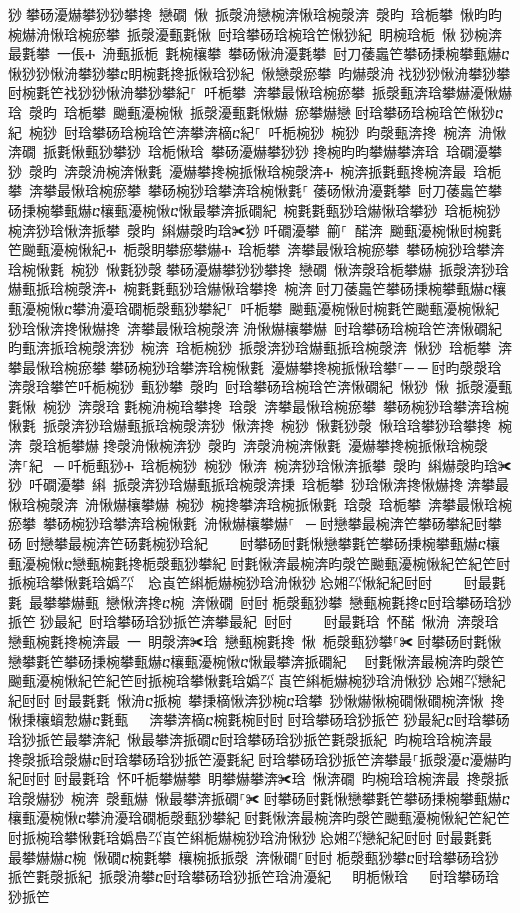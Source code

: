 ﻿\documentclass[output=paper]{langsci/langscibook}
\begin{document}
\begin{exe}
{\begin{exe}
猀਀攀砀瀀爀攀猀猀攀搀 戀礀 愀 挀漀洀戀椀渀愀琀椀漀渀 漀昀 琀栀攀 愀昀昀椀爀洀愀琀椀瘀攀 挀漀瀀甀氀愀 尀琀攀砀琀椀琀笀愀猀紀 眀椀琀栀 愀਀猀椀渀最氀攀 一倀Ⰰ 洀甀挀栀 氀椀欀攀 攀砀愀洀瀀氀攀 尀刀䔀䘀笀攀砀㨀椀攀甀爀ⴀ愀猀猀愀洀攀猀攀ⴀ眀椀氀搀挀愀琀猀紀 愀戀漀瘀攀 昀爀漀洀਀䄀猀猀愀洀攀猀攀尀椀氀笀䄀猀猀愀洀攀猀攀紀⸀ 吀栀攀 渀攀最愀琀椀瘀攀 挀漀甀渀琀攀爀瀀愀爀琀 漀昀 琀栀攀 䬀甀瀀椀愀 挀漀瀀甀氀愀爀 瘀攀爀戀਀尀琀攀砀琀椀琀笀愀猀ⴀ紀 椀猀 尀琀攀砀琀椀琀笀渀攀渀樀ⴀ紀⸀ 吀栀椀猀 椀猀 昀漀甀渀搀 椀渀 洀愀渀礀 挀氀愀甀猀攀猀 琀栀愀琀 攀砀瀀爀攀猀猀਀搀椀昀昀攀爀攀渀琀 琀礀瀀攀猀 漀昀 渀漀洀椀渀愀氀 瀀爀攀搀椀挀愀琀椀漀渀Ⰰ 椀渀挀氀甀搀椀渀最 琀栀攀 渀攀最愀琀椀瘀攀 攀砀椀猀琀攀渀琀椀愀氀⸀਀䔀砀愀洀瀀氀攀 尀刀䔀䘀笀攀砀㨀椀攀甀爀ⴀ欀甀瀀椀愀ⴀ愀最攀渀挀礀紀 椀氀氀甀猀琀爀愀琀攀猀 琀栀椀猀 椀渀猀琀愀渀挀攀 漀昀 䌀爀漀昀琀✀猀਀吀礀瀀攀 䈀⸀ 䤀渀 䬀甀瀀椀愀尀椀氀笀䬀甀瀀椀愀紀Ⰰ 栀漀眀攀瘀攀爀Ⰰ 琀栀攀 渀攀最愀琀椀瘀攀 攀砀椀猀琀攀渀琀椀愀氀 椀猀 愀氀猀漀਀攀砀瀀爀攀猀猀攀搀 戀礀 愀渀漀琀栀攀爀 挀漀渀猀琀爀甀挀琀椀漀渀Ⰰ 椀氀氀甀猀琀爀愀琀攀搀 椀渀਀尀刀䔀䘀笀攀砀㨀椀攀甀爀ⴀ欀甀瀀椀愀ⴀ攀洀瀀琀礀栀漀甀猀攀紀⸀ 吀栀攀 䬀甀瀀椀愀尀椀氀笀䬀甀瀀椀愀紀 猀琀愀渀搀愀爀搀 渀攀最愀琀椀漀渀਀洀愀爀欀攀爀 尀琀攀砀琀椀琀笀渀愀礀紀 昀甀渀挀琀椀漀渀猀 椀渀 琀栀椀猀 挀漀渀猀琀爀甀挀琀椀漀渀 愀猀 琀栀攀 渀攀最愀琀椀瘀攀਀攀砀椀猀琀攀渀琀椀愀氀 瀀爀攀搀椀挀愀琀攀⸀─਀─਀尀昀漀漀琀渀漀琀攀笀吀栀椀猀 甀猀攀 漀昀 尀琀攀砀琀椀琀笀渀愀礀紀 愀猀 愀 挀漀瀀甀氀愀 椀猀 渀漀琀਀氀椀洀椀琀攀搀 琀漀 渀攀最愀琀椀瘀攀 攀砀椀猀琀攀渀琀椀愀氀 挀漀渀猀琀爀甀挀琀椀漀渀猀 愀渀搀 椀猀 愀氀猀漀 愀琀琀攀猀琀攀搀 椀渀 漀琀栀攀爀਀搀漀洀愀椀渀猀 漀昀 渀漀洀椀渀愀氀 瀀爀攀搀椀挀愀琀椀漀渀⸀紀 ਀─਀吀栀甀猀Ⰰ 琀栀椀猀 椀猀 愀渀 椀渀猀琀愀渀挀攀 漀昀 䌀爀漀昀琀✀猀 吀礀瀀攀 䌀 挀漀渀猀琀爀甀挀琀椀漀渀㨀 琀栀攀 猀琀愀渀搀愀爀搀਀渀攀最愀琀椀漀渀 洀愀爀欀攀爀 椀猀 椀搀攀渀琀椀挀愀氀 琀漀 琀栀攀 渀攀最愀琀椀瘀攀 攀砀椀猀琀攀渀琀椀愀氀 洀愀爀欀攀爀⸀ ਀─਀尀戀攀最椀渀笀攀砀攀紀尀攀砀਀尀戀攀最椀渀笀砀氀椀猀琀紀਀    尀攀砀尀氀愀戀攀氀笀攀砀㨀椀攀甀爀ⴀ欀甀瀀椀愀ⴀ戀甀椀氀搀栀漀甀猀攀紀਀尀氀愀渀最椀渀昀漀笀䬀甀瀀椀愀紀笀紀笀尀挀椀琀攀愀氀琀嬀㌀　㤀崀笀䌀栀爀椀猀琀洀愀猀㄀㤀㜀㌀愀紀紀尀尀਀    尀最氀氀 最攀攀爀甀 戀愀渀搀ⴀ椀 渀愀礀 尀尀਀栀漀甀猀攀 戀甀椀氀搀ⴀ尀琀攀砀琀猀挀笀㄀猀最紀 尀琀攀砀琀猀挀笀渀攀最紀 尀尀਀    尀最氀琀 怀䤀 愀洀 渀漀琀 戀甀椀氀搀椀渀最 ⼀ 眀漀渀✀琀 戀甀椀氀搀 愀 栀漀甀猀攀⸀✀਀尀攀砀尀氀愀戀攀氀笀攀砀㨀椀攀甀爀ⴀ欀甀瀀椀愀ⴀ愀最攀渀挀礀紀਀  尀氀愀渀最椀渀昀漀笀䬀甀瀀椀愀紀笀紀笀尀挀椀琀攀愀氀琀嬀㌀㄀崀笀䌀栀爀椀猀琀洀愀猀㄀㤀㜀㌀戀紀紀尀尀਀尀最氀氀 愀洀ⴀ挀椀 攀㨀樀愀渀猀椀ⴀ琀攀 猀愀爀愀椀礀愀礀椀渀愀 搀愀㨀欀蠀愂爀ⴀ氀甀   渀攀渀樀ⴀ椀氀椀尀尀਀尀琀攀砀琀猀挀笀㄀猀最紀ⴀ尀琀攀砀琀猀挀笀最攀渀紀 愀最攀渀挀礀ⴀ尀琀攀砀琀猀挀笀氀漀挀紀 昀椀琀琀椀渀最 搀漀挀琀漀爀ⴀ尀琀攀砀琀猀挀笀瀀氀紀਀尀琀攀砀琀猀挀笀渀攀最⸀挀漀瀀ⴀ瀀爀昀紀尀尀਀尀最氀琀 怀吀栀攀爀攀 眀攀爀攀渀✀琀 愀渀礀 昀椀琀琀椀渀最 搀漀挀琀漀爀猀 椀渀 漀甀爀 愀最攀渀挀礀⸀✀਀尀攀砀尀氀愀戀攀氀笀攀砀㨀椀攀甀爀ⴀ欀甀瀀椀愀ⴀ攀洀瀀琀礀栀漀甀猀攀紀਀尀氀愀渀最椀渀昀漀笀䬀甀瀀椀愀紀笀紀笀尀挀椀琀攀愀氀琀嬀㠀㌀崀笀䌀栀爀椀猀琀洀愀猀㄀㤀㜀㌀戀紀紀尀尀਀尀最氀氀 最攀爀爀ⴀ椀 愀礀ⴀ椀氀攀 欀椀挀挀漀 渀愀礀⸀尀尀਀栀漀甀猀攀ⴀ尀琀攀砀琀猀挀笀氀漀挀紀 挀漀洀攀ⴀ尀琀攀砀琀猀挀笀琀洀瀀紀   眀栀愀琀   尀琀攀砀琀猀挀笀
\end{exe}}
\end{exe}
\end{document}
